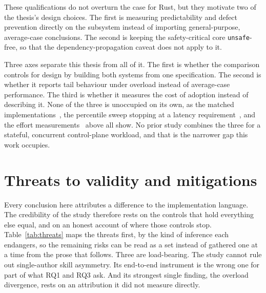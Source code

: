 \documentclass[english,oneside,a4paper,censored,csm,software-track-2020]{HYthesisML}
\begin{document}
These qualifications do not overturn the case for Rust, but they motivate two of the thesis's
design choices. The first is measuring predictability and defect prevention directly on the
subsystem instead of importing general-purpose, average-case conclusions. The second is keeping
the safety-critical core \texttt{unsafe}-free, so that the dependency-propagation caveat does not
apply to it.

Three axes separate this thesis from all of it. The first is whether the comparison controls for
design by building both systems from one specification. The second is whether it reports tail
behaviour under overload instead of average-case performance. The third is whether it measures the
cost of adoption instead of describing it. None of the three is unoccupied on its own, as the matched
implementations~\cite{emmerich2019drivers,li2021ipc,narayanan2020redleaf,suchert2023stamp,gonzalez2023rustudp,pirelli2023safelowlevel,emberg2023asn1},
the percentile sweep stopping at a latency requirement~\cite{arvidsson2025async}, and the effort
measurements~\cite{karlback2021ran,fulton2021adopting} above all show. No prior study combines the
three for a stateful, concurrent control-plane workload, and that is the narrower gap this work
occupies.

\section{Threats to validity and mitigations}\label{sec:threats}
Every conclusion here attributes a difference to the implementation language. The
credibility of the study therefore rests on the controls that hold everything else equal, and on an
honest account of where those controls stop. Table~\ref{tab:threats} maps the threats first, by the
kind of inference each endangers, so the remaining risks can be read as a set instead of
gathered one at a time from the prose that follows. Three are load-bearing. The study cannot rule
out single-author skill asymmetry. Its end-to-end instrument is the wrong one for part of what RQ1
and RQ3 ask. And its strongest single finding, the overload divergence, rests on an attribution it
did not measure directly.
\end{document}
